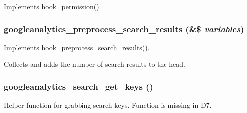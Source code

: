 \label{googleanalytics_8module_ae66161f9d90584b809a6a68445ba4da7}
Implements hook\_\-permission(). \hypertarget{googleanalytics_8module_af643e5263879dfd58196eca6e850edc5}{
\subsubsection[{googleanalytics\_\-preprocess\_\-search\_\-results}]{\setlength{\rightskip}{0pt plus 5cm}googleanalytics\_\-preprocess\_\-search\_\-results (\&\$ {\em variables})}}
\label{googleanalytics_8module_af643e5263879dfd58196eca6e850edc5}
Implements hook\_\-preprocess\_\-search\_\-results().

Collects and adds the number of search results to the head. \hypertarget{googleanalytics_8module_a92c9e263a13d97031e1597db4f43af48}{
\subsubsection[{googleanalytics\_\-search\_\-get\_\-keys}]{\setlength{\rightskip}{0pt plus 5cm}googleanalytics\_\-search\_\-get\_\-keys ()}}
\label{googleanalytics_8module_a92c9e263a13d97031e1597db4f43af48}
Helper function for grabbing search keys. Function is missing in D7.

